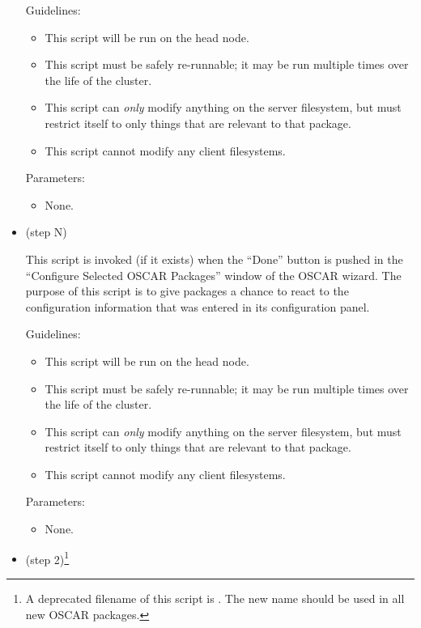 \begin{itemize}
  Guidelines:

  \begin{itemize}
  \item This script will be run on the head node.
  \item This script must be safely re-runnable; it may be run multiple
    times over the life of the cluster.
  \item This script can {\em only} modify anything on the server
    filesystem, but must restrict itself to only things that are
    relevant to that package.
  \item This script cannot modify any client filesystems.
  \end{itemize}

  Parameters:
  
  \begin{itemize}
  \item None.
  \end{itemize}

\item {} (step N)
  
  This script is invoked (if it exists) when the ``Done'' button is
  pushed in the ``Configure Selected OSCAR Packages'' window of the
  OSCAR wizard.  The purpose of this script is to give packages a
  chance to react to the configuration information that was entered in
  its configuration panel.

  Guidelines:

  \begin{itemize}
  \item This script will be run on the head node.
  \item This script must be safely re-runnable; it may be run multiple
    times over the life of the cluster.
  \item This script can {\em only} modify anything on the server
    filesystem, but must restrict itself to only things that are
    relevant to that package.
  \item This script cannot modify any client filesystems.
  \end{itemize}

  Parameters:
  
  \begin{itemize}
  \item None.
  \end{itemize}

\endchange
  
\item {} (step 2)\footnote{A deprecated
    filename of this script is .  The
    new name  should be used in all
    new OSCAR packages.}
  

\end{itemize}
